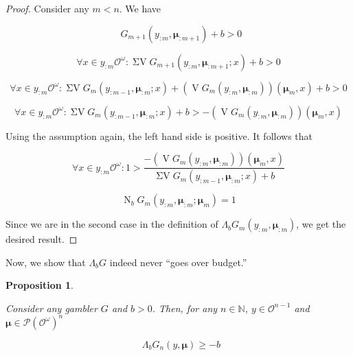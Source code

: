 \documentclass[11pt]{article}
\theoremstyle{definition}
\theoremstyle{plain}
\newtheorem{proposition}{Proposition}%
\newcommand{\Nats}{\mathbb{N}}
\newcommand{\PM}{\mathcal{P}}
\newcommand{\Ob}{\mathcal{O}}
\newcommand{\OO}{\Ob^\omega}
\newcommand{\PMO}{\PM(\OO)}
\DeclareMathOperator{\V}{V}
\DeclareMathOperator{\SV}{\Sigma V}
\DeclareMathOperator{\SVM}{\Sigma V_{\min}}
\DeclareMathOperator{\Nr}{N}
\newcommand{\Bd}{\Lambda}
\newcommand{\BM}{\bm{\mu}}
\begin{document}
\begin{proof}

Consider any $m < n$. We have

$$\SVM G_{m+1}\left(y_{:m},\BM_{:m+1}\right) + b > 0$$

$$\forall x \in y_{:m}\OO: \SV G_{m+1}\left(y_{:m},\BM_{:m+1}; x\right) + b > 0$$

$$\forall x \in y_{:m}\OO: \SV G_{m}\left(y_{:m-1},\BM_{:m}; x\right) + \left(\V G_{m}\left(y_{:m},\BM_{:m}\right)\right)\left(\BM_{m}, x\right) + b > 0$$

$$\forall x \in y_{:m}\OO: \SV G_{m}\left(y_{:m-1},\BM_{:m}; x\right) + b > -\left(\V G_{m}\left(y_{:m},\BM_{:m}\right)\right)\left(\BM_{m}, x\right)$$

Using the assumption again, the left hand side is positive. It follows that

$$\forall x \in y_{:m}\OO: 1 > \frac{-\left(\V G_{m}\left(y_{:m},\BM_{:m}\right)\right)\left(\BM_{m}, x\right)}{\SV G_{m}\left(y_{:m-1},\BM_{:m}; x\right) + b}$$

$$\Nr_b G_m\left(y_{:m},\BM_{:m};\BM_m\right) = 1$$

Since we are in the second case in the definition of ${\Bd_b G_m\left(y_{:m},\BM_{:m}\right)}$, we get the desired result.
\end{proof}

Now, we show that $\Bd_b G$ indeed never \enquote{goes over budget.}

\begin{proposition}
\label{prp:b_stays_in_budget}

Consider any gambler $G$ and $b > 0$. Then, for any $n \in \Nats$, $y \in \Ob^{n-1}$ and $\BM \in \PMO^n$

\begin{equation}
\SVM \Bd_b G_n\left(y,\BM\right) \geq -b
\end{equation} 

\end{proposition}
\end{document}
